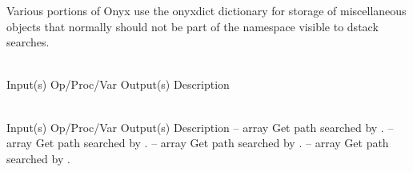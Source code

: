 Various portions of Onyx use the onyxdict dictionary for storage of
miscellaneous objects that normally should not be part of the namespace visible
to dstack searches.

\begin{longtable}{}
\caption{onyxdict summary}
\\
\hline
\optableent
	{Input(s)}
	{Op/Proc/Var}
	{Output(s)}
	{Description}
\hline \hline
\endfirsthead
\caption[]{\emph{continued}} \\
\hline
\optableent
	{Input(s)}
	{Op/Proc/Var}
	{Output(s)}
	{Description}
\hline \hline \endhead
{} \endfoot
\hline \endlastfoot
\optableent
	{--}
	{{\bf {}}}
	{array}
	{Get path searched by .}
\hline
\optableent
	{--}
	{{\bf {}}}
	{array}
	{Get path searched by .}
\hline
\optableent
	{--}
	{{\bf {}}}
	{array}
	{Get path searched by .}
\hline
\optableent
	{--}
	{{\bf {}}}
	{array}
	{Get path searched by .}
\end{longtable}

